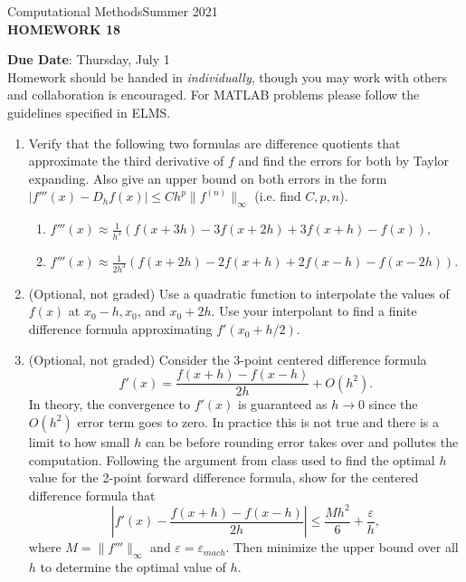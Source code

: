 \documentclass[12pt]{article}
\begin{document}
\begin{center}
Computational Methods\qquad Summer 2021
\\

\textbf{\large HOMEWORK 18}\\
\end{center}
\noindent \textbf{Due Date}: Thursday, July 1\\

\noindent Homework should be handed in \emph{individually}, though you may work with others and collaboration is encouraged. For MATLAB problems please follow the guidelines specified in ELMS.

\begin{enumerate}
\item Verify that the following two formulas are difference quotients that approximate the third derivative of $f$ and find the errors for both by Taylor expanding. Also give an upper bound on both errors in the form $|f'''(x)-D_h f(x)|\le Ch^p \|f^{(n)}\|_\infty$ (i.e. find $C,p,n$).
	\begin{enumerate}
	\item $f'''(x)\approx \displaystyle{\frac{1}{h^3}(f(x+3h)-3f(x+2h)+3f(x+h)-f(x))},$
	\item $f'''(x)\approx \displaystyle{\frac{1}{2h^3}(f(x+2h)-2f(x+h)+2f(x-h)-f(x-2h))}.$
	\end{enumerate}
\item (Optional, not graded) Use a quadratic function to interpolate the values of $f(x)$ at $x_0-h, x_0$, and $x_0 +2h$. Use your interpolant to find a finite difference formula approximating $f'(x_0+h/2)$.
\item (Optional, not graded) Consider the 3-point centered difference formula \[\displaystyle{f'(x) = \frac{f(x+h)-f(x-h)}{2h} + O(h^2)}.\] In theory, the convergence to $f'(x)$ is guaranteed as $h\rightarrow 0$ since the $O(h^2)$ error term goes to zero. In practice this is not true and there is a limit to how small $h$ can be before rounding error takes over and pollutes the computation. Following the argument from class used to find the optimal $h$ value for the 2-point forward difference formula, show for the centered difference formula that
	\[\left|f'(x)-\frac{f(x+h)-f(x-h)}{2h}\right|\le \frac{Mh^2}{6}+\frac{\varepsilon}{h},\]
where $M = \|f'''\|_{\infty}$ and $\varepsilon = \varepsilon_{mach}$. Then minimize the upper bound over all $h$ to determine the optimal value of $h$.
\end{enumerate}
\end{document}
